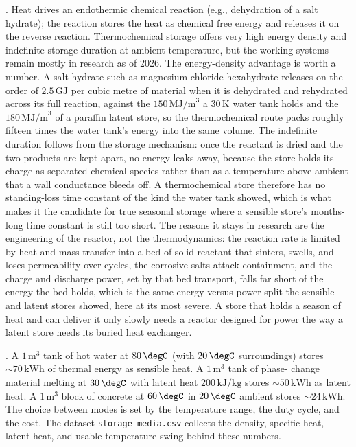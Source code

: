 . Heat drives an endothermic chemical
reaction (e.g., dehydration of a salt hydrate); the reaction stores
the heat as chemical free energy and releases it on the reverse
reaction. Thermochemical storage offers very high energy density and
indefinite storage duration at ambient temperature, but the working
systems remain mostly in research as of 2026. The energy-density
advantage is worth a number. A salt hydrate such as magnesium chloride
hexahydrate releases on the order of $2.5\,\text{GJ}$ per cubic metre of
material when it is dehydrated and rehydrated across its full reaction,
against the $150\,\text{MJ/m}^3$ a $30\,\si{\kelvin}$ water tank holds and
the $180\,\text{MJ/m}^3$ of a paraffin latent store, so the thermochemical
route packs roughly fifteen times the water tank's energy into the same
volume. The indefinite duration follows from the storage mechanism: once
the reactant is dried and the two products are kept apart, no energy leaks
away, because the store holds its charge as separated chemical species
rather than as a temperature above ambient that a wall conductance bleeds
off. A thermochemical store therefore has no standing-loss time constant of
the kind the water tank showed, which is what makes it the candidate for
true seasonal storage where a sensible store's months-long time constant is
still too short. The reasons it stays in research are the engineering of the
reactor, not the thermodynamics: the reaction rate is limited by heat and
mass transfer into a bed of solid reactant that sinters, swells, and loses
permeability over cycles, the corrosive salts attack containment, and the
charge and discharge power, set by that bed transport, falls far short of
the energy the bed holds, which is the same energy-versus-power split the
sensible and latent stores showed, here at its most severe. A store that
holds a season of heat and can deliver it only slowly needs a reactor
designed for power the way a latent store needs its buried heat exchanger.

. A $1\,\text{m}^3$ tank of hot water at $80\,
\degC$ (with $20\,\degC$ surroundings) stores $\sim 70\,\text{kWh}$
of thermal energy as sensible heat. A $1\,\text{m}^3$ tank of phase-
change material melting at $30\,\degC$ with latent heat $200\,\text{kJ/kg}$
stores $\sim 50\,\text{kWh}$ as latent heat. A $1\,\text{m}^3$ block
of concrete at $60\,\degC$ in $20\,\degC$ ambient stores $\sim 24\,
\text{kWh}$. The choice between modes is set by the temperature range,
the duty cycle, and the cost. The dataset
\texttt{storage\_media.csv} collects the density, specific heat,
latent heat, and usable temperature swing behind these numbers.

